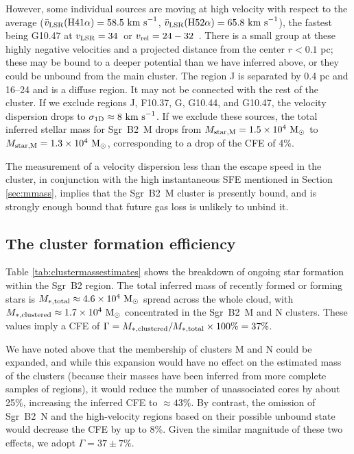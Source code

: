 \documentclass[twocolumn]{aastex62}
\begin{document}
However, some individual sources are moving at high velocity with respect to
the average ($\bar{v}_{\rm LSR}(\rm H41\alpha) = 58.5~\textrm{km~s}^{-1}$, $\bar{v}_{\rm LSR}(\rm H52\alpha)
= 65.8~\textrm{km~s}^{-1}$), the fastest being G10.47 at $v_{\rm LSR}=34$~\kms or
$v_{\rm rel}=24-32$~\kms.  There is a small group at these highly negative
velocities and a projected distance from the center $r<0.1$ pc; these may be
bound to a deeper potential than we have inferred above, or they could be unbound
from the main cluster.
The \hii region J is separated by 0.4 pc and 16--24 \kms and is a diffuse \hii
region.  It may not be connected with the rest of the cluster.
If we exclude regions J, F10.37, G, G10.44, and G10.47, the velocity dispersion
drops to $\sigma_{\rm 1D}\approx8~\textrm{km~s}^{-1}$.  If we exclude these sources, the total
inferred stellar mass for Sgr~B2~M drops from $M_{\rm star,M} = 1.5\times10^{4}~\mathrm{M}_{\odot}$ to
$M_{\rm star,M}=1.3\times10^{4}~\mathrm{M}_{\odot}$, corresponding to a drop of the CFE of 4\%.

The measurement of a velocity dispersion less than the escape speed in the cluster,
in conjunction with the high instantaneous SFE mentioned in Section \ref{sec:mmass},
implies that the Sgr~B2~M cluster is presently bound, and is strongly enough
bound that future gas loss is unlikely to unbind it.


\clearpage

\clearpage

\subsection{The cluster formation efficiency}
Table \ref{tab:clustermassestimates} shows the breakdown of ongoing star
formation within the Sgr~B2 region.  The total inferred mass of recently
formed or forming stars is ${M_{\rm *,total}\approx4.6\times10^{4}~\mathrm{M}_{\odot}}$ spread across
the whole cloud, with ${M_{\rm *,clustered}\approx1.7\times10^{4}~\mathrm{M}_{\odot}}$ concentrated
in the Sgr~B2~M and N clusters.  These values imply a CFE of
$\Gamma=M_{\rm *,clustered}/M_{\rm *,total}\times100\% = 37\%$. 

We have noted above that the membership of clusters M and N could be expanded,
and while this expansion would have no effect on the estimated mass of the clusters
(because their masses have been inferred from more complete samples of \hii regions),
it would reduce the number of unassociated cores by about 25\%, increasing the inferred
CFE to $\approx43\%$. By contrast, the omission of Sgr~B2~N and the
high-velocity \hii regions based on their possible unbound state would decrease
the CFE by up to 8\%. Given the similar magnitude of these two effects, we
adopt $\Gamma=37\pm7\%$. 
\end{document}

